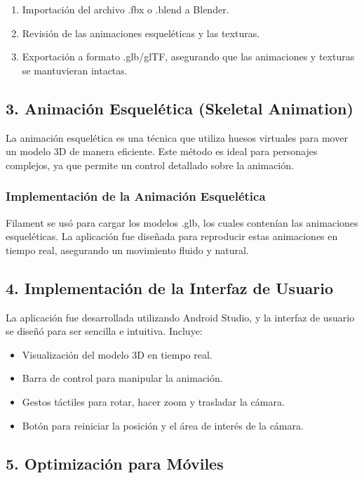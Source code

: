 \documentclass[conference]{IEEEtran}
\begin{document}
\begin{enumerate}
    \item Importación del archivo .fbx o .blend a Blender.
    \item Revisión de las animaciones esqueléticas y las texturas.
    \item Exportación a formato .glb/glTF, asegurando que las animaciones y texturas se mantuvieran intactas.
\end{enumerate}

\subsection{3. Animación Esquelética (Skeletal Animation)}

La animación esquelética es una técnica que utiliza huesos virtuales para mover un modelo 3D de manera eficiente. Este método es ideal para personajes complejos, ya que permite un control detallado sobre la animación.

\subsubsection{Implementación de la Animación Esquelética}

Filament se usó para cargar los modelos .glb, los cuales contenían las animaciones esqueléticas. La aplicación fue diseñada para reproducir estas animaciones en tiempo real, asegurando un movimiento fluido y natural.

\subsection{4. Implementación de la Interfaz de Usuario}

La aplicación fue desarrollada utilizando Android Studio, y la interfaz de usuario se diseñó para ser sencilla e intuitiva. Incluye:

\begin{itemize}
    \item Visualización del modelo 3D en tiempo real.
    \item Barra de control para manipular la animación.
    \item Gestos táctiles para rotar, hacer zoom y trasladar la cámara.
    \item Botón para reiniciar la posición y el área de interés de la cámara.
\end{itemize}

\subsection{5. Optimización para Móviles}
\end{document}
